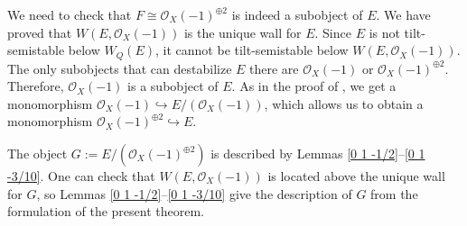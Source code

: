 \documentclass{amsart}
\begin{document}
\begin{enumerate}
		We need to check that $F\cong\mathcal O_X(-1)^{\oplus 2}$ is indeed a subobject of $E$. We have proved that $W(E,\mathcal O_X(-1))$ is the unique wall for $E$. Since $E$ is not tilt-semistable below $W_Q(E)$, it cannot be tilt-semistable below $W(E,\mathcal O_X(-1))$. The only subobjects that can destabilize $E$ there are $\mathcal O_X(-1)$ or $\mathcal O_X(-1)^{\oplus 2}$. Therefore, $\mathcal O_X(-1)$ is a subobject of $E$. As in the proof of \cite[Proposition 3.2]{MS18}, we get a monomorphism $\mathcal O_X(-1)\hookrightarrow E/(\mathcal O_X(-1))$, which allows us to obtain a monomorphism $\mathcal O_X(-1)^{\oplus 2}\hookrightarrow E$. 
		
		The object $G:=E/(\mathcal O_X(-1)^{\oplus 2})$ is described by Lemmas \ref{0 1 -1/2}--\ref{0 1 -3/10}. One can check that $W(E,\mathcal O_X(-1))$ is located above the unique wall for $G$, so Lemmas \ref{0 1 -1/2}--\ref{0 1 -3/10} give the description of $G$ from the formulation of the present theorem.
		

\end{enumerate}
\end{document}
